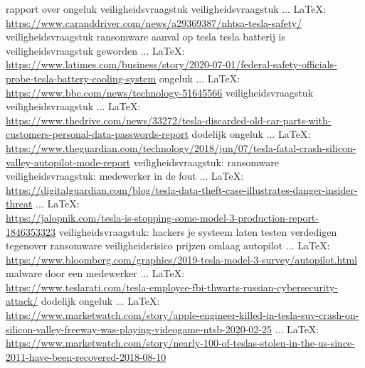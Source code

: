 \begin{thebibliography}{99}
{{{{				rapport over ongeluk
				veiligheidsvraagstuk
				veiligheidsvraagstuk
				 ... \LaTeX:\\ \url{https://www.caranddriver.com/news/a29369387/nhtsa-tesla-safety/}
				veiligheidsvraagstuk
				ransomware aanval op tesla
				tesla batterij is veiligheidsvraagstuk geworden
				 ... \LaTeX:\\ \url{https://www.latimes.com/business/story/2020-07-01/federal-safety-officials-probe-tesla-battery-cooling-system}
				ongeluk
				 ... \LaTeX:\\ \url{https://www.bbc.com/news/technology-51645566}
				veiligheidsvraagstuk
				veiligheidsvraagstuk
				 ... \LaTeX:\\ \url{https://www.thedrive.com/news/33272/tesla-discarded-old-car-parts-with-customers-personal-data-passwords-report}
				dodelijk ongeluk
				 ... \LaTeX:\\ \url{https://www.theguardian.com/technology/2018/jun/07/tesla-fatal-crash-silicon-valley-autopilot-mode-report}
				veiligheidsvraagstuk: ransomware
				veiligheidsvraagstuk: medewerker in de fout
				 ... \LaTeX:\\ \url{https://digitalguardian.com/blog/tesla-data-theft-case-illustrates-danger-insider-threat}
				 ... \LaTeX:\\ \url{https://jalopnik.com/tesla-is-stopping-some-model-3-production-report-1846353323}
				veiligheidsvraagstuk: hackers je systeem laten testen
				verdedigen tegenover ransomware
				veiligheidsrisico
				prijzen omlaag
				autopilot
				 ... \LaTeX:\\ \url{https://www.bloomberg.com/graphics/2019-tesla-model-3-survey/autopilot.html}
				malware door een medewerker
				 ... \LaTeX:\\ \url{https://www.teslarati.com/tesla-employee-fbi-thwarts-russian-cybersecurity-attack/}
				dodelijk ongeluk
				 ... \LaTeX:\\ \url{https://www.marketwatch.com/story/apple-engineer-killed-in-tesla-suv-crash-on-silicon-valley-freeway-was-playing-videogame-ntsb-2020-02-25}
				 ... \LaTeX:\\ \url{https://www.marketwatch.com/story/nearly-100-of-teslas-stolen-in-the-us-since-2011-have-been-recovered-2018-08-10}
}}}}
\end{thebibliography}
